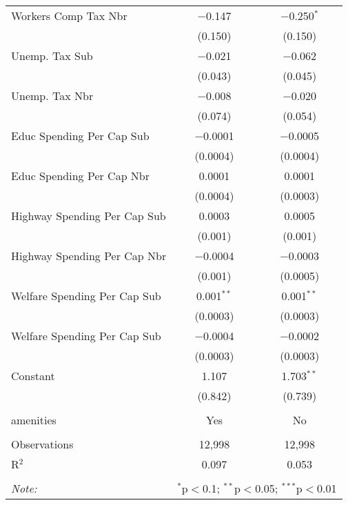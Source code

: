 \begin{table}[!htbp]
\begin{tabular}{@{\extracolsep{5pt}}lcc}
  Workers Comp Tax Nbr & $-$0.147 & $-$0.250$^{*}$ \\ 
  & (0.150) & (0.150) \\ 
  Unemp. Tax Sub & $-$0.021 & $-$0.062 \\ 
  & (0.043) & (0.045) \\ 
  Unemp. Tax Nbr & $-$0.008 & $-$0.020 \\ 
  & (0.074) & (0.054) \\ 
  Educ Spending Per Cap Sub & $-$0.0001 & $-$0.0005 \\ 
  & (0.0004) & (0.0004) \\ 
  Educ Spending Per Cap Nbr & 0.0001 & 0.0001 \\ 
  & (0.0004) & (0.0003) \\ 
  Highway Spending Per Cap Sub & 0.0003 & 0.0005 \\ 
  & (0.001) & (0.001) \\ 
  Highway Spending Per Cap Nbr & $-$0.0004 & $-$0.0003 \\ 
  & (0.001) & (0.0005) \\ 
  Welfare Spending Per Cap Sub & 0.001$^{**}$ & 0.001$^{**}$ \\ 
  & (0.0003) & (0.0003) \\ 
  Welfare Spending Per Cap Sub & $-$0.0004 & $-$0.0002 \\ 
  & (0.0003) & (0.0003) \\ 
  Constant & 1.107 & 1.703$^{**}$ \\ 
  & (0.842) & (0.739) \\ 
 \hline \\[-1.8ex] 
amenities & Yes & No \\ 
\hline \\[-1.8ex] 
Observations & 12,998 & 12,998 \\ 
R$^{2}$ & 0.097 & 0.053 \\ 
\hline 
\hline \\[-1.8ex] 
\textit{Note:}  & \multicolumn{2}{r}{$^{*}$p$<$0.1; $^{**}$p$<$0.05; $^{***}$p$<$0.01} \\ 
\end{tabular} 
\end{table} 
